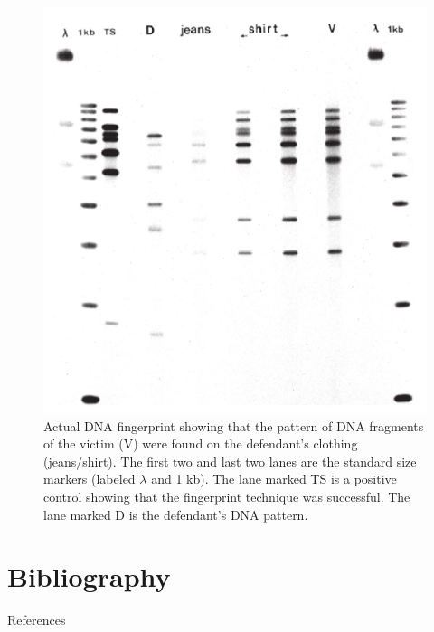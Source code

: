 \documentclass[
  ignorenonframetext,
  aspectratio=169]{beamer}
\begin{document}
\begin{frame}{}
\protect\hypertarget{section-5}{}
\begin{figure}
\includegraphics[width=0.4\linewidth]{../images/fingerprint_lanes} \caption{Actual DNA fingerprint showing that the pattern of DNA fragments of the victim (V) were found on the defendant's clothing (jeans/shirt). The first two and last two lanes are the standard size markers (labeled $\lambda$ and 1 kb). The lane marked TS is a positive control showing that the fingerprint technique was successful. The lane marked D is the defendant's DNA pattern.}\label{fig:fingerprint-lanes}
\end{figure}
\end{frame}

\hypertarget{bibliography}{%
\section{Bibliography}\label{bibliography}}

\begin{frame}{References}
\protect\hypertarget{references}{}
\end{frame}
\end{document}
